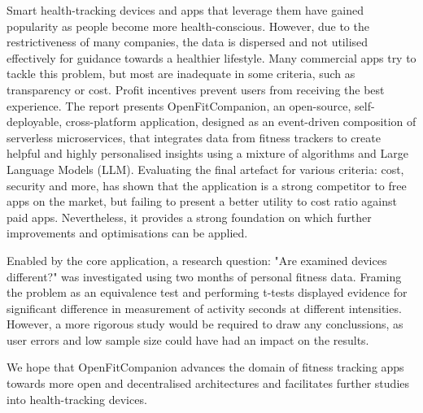 %
{\singlespacing
Smart health-tracking devices and apps that leverage them have gained popularity as people become more health-conscious. However, due to the restrictiveness of many companies, the data is dispersed and not utilised effectively for guidance towards a healthier lifestyle. Many commercial apps try to tackle this problem, but most are inadequate in some criteria, such as transparency or cost. Profit incentives prevent users from receiving the best experience. The report presents OpenFitCompanion, an open-source, self-deployable, cross-platform application, designed as an event-driven composition of serverless microservices, that integrates data from fitness trackers to create helpful and highly personalised insights using a mixture of algorithms and Large Language Models (LLM).  Evaluating the final artefact for various criteria: cost, security and more, has shown that the application is a strong competitor to free apps on the market, but failing to present a better utility to cost ratio against paid apps. Nevertheless, it provides a strong foundation on which further improvements and optimisations can be applied.

Enabled by the core application, a research question: "Are examined devices different?" was investigated using two months of personal fitness data. Framing  the problem as an equivalence test and performing t-tests displayed evidence for significant difference in measurement of activity seconds at different intensities. However, a more rigorous study would be required to draw any conclussions, as user errors and low sample size could have had an impact on the results. 

We hope that OpenFitCompanion advances the domain of fitness tracking apps towards more open and decentralised architectures and facilitates further studies into health-tracking devices. 
}

